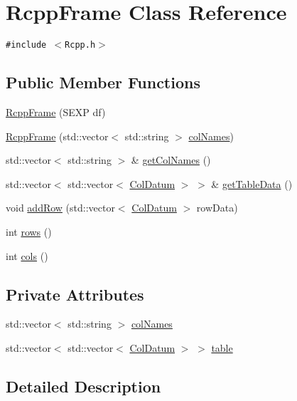 \hypertarget{classRcppFrame}{
\section{RcppFrame Class Reference}
\label{classRcppFrame}
}
{\tt \#include $<$Rcpp.h$>$}

\subsection*{Public Member Functions}
\begin{CompactItemize}
\item 
\hyperlink{classRcppFrame_2aad548eb7d3842ea12da3c5a67bbfbc}{RcppFrame} (SEXP df)
\item 
\hyperlink{classRcppFrame_d3caf84a0543c0f31a97705be8902358}{RcppFrame} (std::vector$<$ std::string $>$ \hyperlink{classRcppFrame_9b549d377248896848b6abcb8df64f82}{colNames})
\item 
std::vector$<$ std::string $>$ \& \hyperlink{classRcppFrame_d220bfd289e745d13a99ffe323a00200}{getColNames} ()
\item 
std::vector$<$ std::vector$<$ \hyperlink{classColDatum}{ColDatum} $>$ $>$ \& \hyperlink{classRcppFrame_3a0ac7b2822fc590f6f93ee775b134d0}{getTableData} ()
\item 
void \hyperlink{classRcppFrame_ae72791527f2947a477633151106f42c}{addRow} (std::vector$<$ \hyperlink{classColDatum}{ColDatum} $>$ rowData)
\item 
int \hyperlink{classRcppFrame_a33ab9553bb9fa510c338a3e092d9ace}{rows} ()
\item 
int \hyperlink{classRcppFrame_ac33f787068fe1bc6f97b2b4e08c9c5d}{cols} ()
\end{CompactItemize}
\subsection*{Private Attributes}
\begin{CompactItemize}
\item 
std::vector$<$ std::string $>$ \hyperlink{classRcppFrame_9b549d377248896848b6abcb8df64f82}{colNames}
\item 
std::vector$<$ std::vector$<$ \hyperlink{classColDatum}{ColDatum} $>$ $>$ \hyperlink{classRcppFrame_4de0bda5c0df650b2447a4c029af0302}{table}
\end{CompactItemize}


\subsection{Detailed Description}


